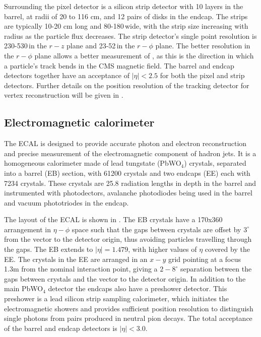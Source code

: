 Surrounding the pixel detector is a silicon strip detector with 10 layers in the barrel, at radii of 20 to 116 cm, and 12 pairs of disks in the endcap. The strips are typically 10-20 cm long and 80-180\micron\,wide, with the strip size increasing with radius as the particle flux decreases. The strip detector's single point resolution is 230-530\micron\,in the $r-z$ plane and 23-52\micron\,in the $r-\phi$ plane.  The better resolution in the $r-\phi$ plane allows a better measurement of \pt, as this is the direction in which a particle's track bends in the CMS magnetic field. The barrel and endcap detectors together have an acceptance of $|\eta|<2.5$ for both the pixel and strip detectors. Further details on the position resolution of the tracking detector for vertex reconstruction will be given in .

\subsection{Electromagnetic calorimeter}
\label{sec:ECAL}
The \ac{ECAL} is designed to provide accurate photon and electron reconstruction and precise measurement of the electromagnetic component of hadron jets. It is a homogeneous calorimeter made of lead tungstate (PbWO$_{4}$) crystals, separated into a barrel (\ac{EB}) section, with 61200 crystals and two endcaps (\ac{EE}) each with 7234 crystals. These crystals are 25.8 radiation lengths in depth in the barrel and instrumented with photodectors, avalanche photodiodes being used in the barrel and vacuum phototriodes in the endcap. 

The layout of the \ac{ECAL} is shown in . The \ac{EB} crystals have a 170x360 arrangement in $\eta-\phi$ space such that the gaps between crystals are offset by $3^{\circ}$ from the vector to the detector origin, thus avoiding particles travelling through the gaps. The \ac{EB} extends to $|\eta|=1.479$, with higher values of $\eta$ covered by the \ac{EE}. The crystals in the \ac{EE} are arranged in an $x-y$ grid pointing at a focus 1.3m from the nominal interaction point, giving a $2-8^{\circ}$ separation between the gaps between crystals and the vector to the detector origin. In addition to the main PbWO$_{4}$ detector the endcaps also have a preshower detector. This preshower is a lead silicon strip sampling calorimeter, which initiates the electromagnetic showers and provides sufficient position resolution to distinguish single photons from pairs produced in neutral pion decays. The total acceptance of the barrel and endcap detectors is $|\eta|<3.0$.

